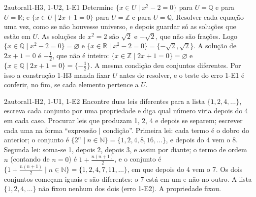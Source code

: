 \begin{exemplo}{}{2}{autoral}{1-H3, 1-U2, 1-E1}
\label{ex:u1:universo}
Determine $\{x\in U\mid x^2-2=0\}$ para $U=\mathbb{Q}$ e para $U=\mathbb{R}$; e $\{x\in U\mid 2x+1=0\}$ para $U=\mathbb{Z}$ e para $U=\mathbb{Q}$.
\plano Resolver cada equação uma vez, como se não houvesse universo, e depois guardar só as soluções que estão em $U$.
\resolucao As soluções de $x^2=2$ são $\sqrt2$ e $-\sqrt2$, que não são frações. Logo $\{x\in\mathbb{Q}\mid x^2-2=0\}=\varnothing$ e $\{x\in\mathbb{R}\mid x^2-2=0\}=\{-\sqrt2,\sqrt2\}$. A solução de $2x+1=0$ é $-\tfrac12$, que não é inteiro: $\{x\in\mathbb{Z}\mid 2x+1=0\}=\varnothing$ e $\{x\in\mathbb{Q}\mid 2x+1=0\}=\{-\tfrac12\}$.
\comentario A mesma condição deu conjuntos diferentes. Por isso a construção 1-H3 manda fixar $U$ antes de resolver, e o teste do erro 1-E1 é conferir, no fim, se cada elemento pertence a $U$.
\end{exemplo}

\begin{exemplo}{}{2}{autoral}{1-H2, 1-U1, 1-E2}
\label{ex:u1:reticencias}
Encontre duas leis diferentes para a lista $\{1,2,4,\ldots\}$, escreva cada conjunto por uma propriedade e diga qual número viria depois do 4 em cada caso.
\plano Procurar leis que produzam 1, 2, 4 e depois se separem; escrever cada uma na forma \enquote{expressão $\mid$ condição}.
\resolucao Primeira lei: cada termo é o dobro do anterior; o conjunto é $\{2^n\mid n\in\mathbb{N}\}=\{1,2,4,8,16,\ldots\}$, e depois do 4 vem o 8. Segunda lei: soma-se 1, depois 2, depois 3, e assim por diante; o termo de ordem $n$ (contando de $n=0$) é $1+\tfrac{n(n+1)}{2}$, e o conjunto é $\{1+\tfrac{n(n+1)}{2}\mid n\in\mathbb{N}\}=\{1,2,4,7,11,\ldots\}$, em que depois do 4 vem o 7.
\comentario Os dois conjuntos começam iguais e são diferentes: o 7 está em um e não no outro. A lista $\{1,2,4,\ldots\}$ não fixou nenhum dos dois (erro 1-E2). A propriedade fixou.
\end{exemplo}

